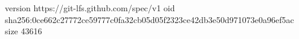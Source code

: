 version https://git-lfs.github.com/spec/v1
oid sha256:0ce662c27772ce59777c0fa32cb05d05f2323ce42db3e50d971073e0a96ef5ac
size 43616
